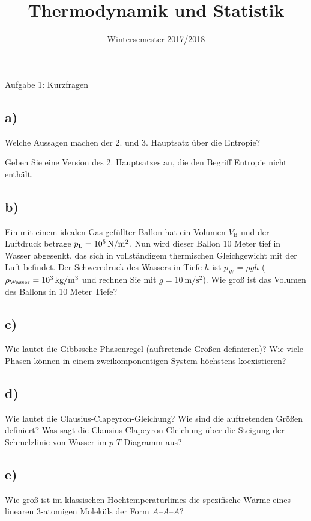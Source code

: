 

\subject{TuS}
\title{Thermodynamik und Statistik}
\date{
    Wintersemester 2017/2018
}



\maketitle
\thispagestyle{empty}
\newpage


\begin{aufgabe}{Aufgabe 1: Kurzfragen}
    \subsection{a)}
    Welche Aussagen machen der 2. und 3. Hauptsatz über die Entropie?

    Geben Sie eine Version des 2. Hauptsatzes an, die den Begriff Entropie nicht enthält.

    \subsection{b)}
    Ein mit einem idealen Gas gefüllter Ballon hat ein Volumen $V_\text{B}$ und der Luftdruck betrage $p_\text{L} = \SI{E5}{\newton\per\square\meter}$.
    Nun wird dieser Ballon 10 Meter tief in Wasser abgesenkt, das sich in vollständigem thermischen Gleichgewicht mit der Luft befindet.
    Der Schweredruck des Wassers in Tiefe $h$ ist $p_\text{W} = \rho g h$ ($\rho_\text{Wasser} = \SI{E3}{\kilogram\per\cubic\meter}$ und rechnen Sie mit $g = \SI{10}{\meter\per\square\second}$).
    Wie groß ist das Volumen des Ballons in 10 Meter Tiefe?

    \subsection{c)}
    Wie lautet die Gibbssche Phasenregel (auftretende Größen definieren)?
    Wie viele Phasen können in einem zweikomponentigen System höchstens koexistieren?

    \subsection{d)}
    Wie lautet die Clausius-Clapeyron-Gleichung?
    Wie sind die auftretenden Größen definiert?
    Was sagt die Clausius-Clapeyron-Gleichung über die Steigung der Schmelzlinie von Wasser im $p$-$T$-Diagramm aus?

    \subsection{e)}
    Wie groß ist im klassischen Hochtemperaturlimes die spezifische Wärme eines linearen 3-atomigen Moleküls der Form $A – A – A$?


\end{aufgabe}
